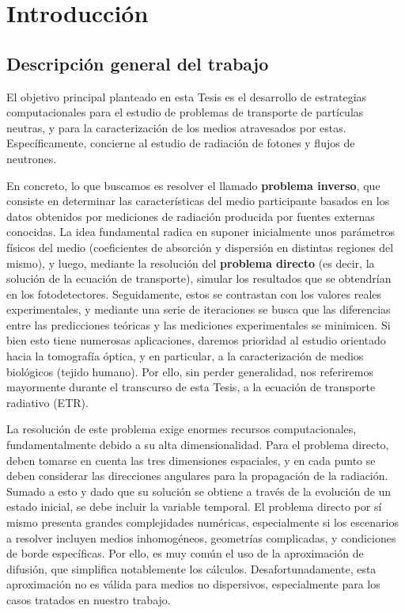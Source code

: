 
\pagestyle{fancy}
\lhead{\thepage}

%


\chapter{Introducción}
\vspace{0.01\textheight}
\pagebreak


\section{Descripción general del trabajo}  

El objetivo principal planteado en esta Tesis es el desarrollo 
de estrategias computacionales para el 
estudio de problemas de transporte de partículas neutras, y para la 
caracterización de los medios atravesados por estas.
Específicamente, concierne al estudio de radiación de fotones y 
flujos de neutrones.

En concreto, lo que buscamos es resolver el llamado  
{\bf problema inverso}, que consiste en determinar las características 
del medio participante basados en los datos obtenidos por mediciones 
de radiación producida por fuentes externas conocidas.
La idea fundamental radica en suponer inicialmente unos parámetros 
físicos del medio (coeficientes de absorción y dispersión en distintas 
regiones del mismo), y luego, mediante la resolución del {\bf problema 
directo} (es decir, la solución de la ecuación de transporte), 
simular los resultados que se obtendrían en los fotodetectores. 
Seguidamente, estos se contrastan con los valores reales experimentales, 
y mediante una serie de iteraciones se busca que las diferencias 
entre las predicciones teóricas y las mediciones experimentales 
se minimicen.
Si bien esto tiene numerosas aplicaciones, daremos prioridad al estudio 
orientado hacia la tomografía óptica, y en particular, a la 
caracterización de medios biológicos (tejido humano). 
Por ello, sin perder generalidad, nos referiremos mayormente 
durante el transcurso de esta Tesis, a la ecuación de transporte radiativo (ETR).

La resolución de este problema exige enormes recursos computacionales, 
fundamentalmente debido a su alta dimensionalidad.
Para el problema directo, deben tomarse en cuenta las tres dimensiones 
espaciales, y en cada punto se deben considerar las direcciones 
angulares para la propagación de la radiación. 
Sumado a esto y dado que su solución se obtiene a través de la 
evolución de un estado inicial, se debe incluir la variable temporal.
El problema directo por sí mismo presenta grandes complejidades 
numéricas, especialmente si los escenarios a resolver incluyen 
medios inhomogéneos, geometrías complicadas, y condiciones de 
borde específicas.
Por ello, es muy común el uso de la aproximación de difusión, 
que simplifica notablemente los cálculos. 
Desafortunadamente, esta aproximación no es válida para medios 
no dispersivos, especialmente para los casos tratados en nuestro trabajo.


